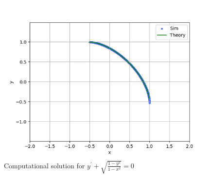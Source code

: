 \documentclass[journal]{IEEEtran}
\begin{document}
\begin{figure}[h!]
   \centering
   \includegraphics[width=0.7\columnwidth]{figs/graph.png}
    \caption{Computational solution for $y^{\prime} + \sqrt{\frac{1 - y^2}{1 - x^2}} = 0$}
   \label{label}
\end{figure}
\end{document}
